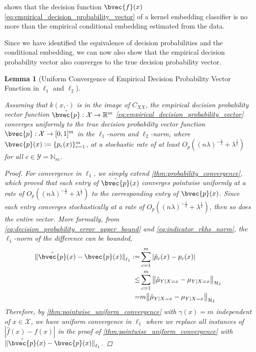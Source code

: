 \documentclass{article}
\newtheorem{lemma}[theorem]{Lemma}
\begin{document}
	 shows that the decision function $\bvec{f}(x)$ \eqref{eq:empirical_decision_probability_vector} of a kernel embedding classifier is no more than the empirical conditional embedding estimated from the data.

	Since we have identified the equivalence of decision probabilities and the conditional embedding, we can now also show that the empirical decision probability vector also converges to the true decision probability vector.

	\begin{lemma}[Uniform Convergence of Empirical Decision Probability Vector Function in $\ell_{1}$ and $\ell_{2}$]
	\label{thm:probability_vector_convergence} 
	
		Assuming that $k(x, \cdot)$ is in the image of $C_{XX}$, the empirical decision probability vector function $\hat{\bvec{p}} : \mathcal{X} \to \mathbb{R}^{m}$ \eqref{eq:empirical_decision_probability_vector} converges uniformly to the true decision probability vector function $\bvec{p} : \mathcal{X} \to [0, 1]^{m}$ in the $\ell_{1}$-norm and $\ell_{2}$-norm, where $\bvec{p}(x) := \{p_{c}(x)\}_{c = 1}^{m}$, at a stochastic rate of at least $O_{p}((n \lambda)^{-\frac{1}{2}} + \lambda^{\frac{1}{2}})$ for all $c \in \mathcal{Y} = \mathbb{N}_{m}$.
		
		\begin{proof}
			For convergence in $\ell_{1}$, we simply extend \cref{thm:probability_convergence}, which proved that each entry of $\hat{\bvec{p}}(x)$ converges pointwise uniformly at a rate of $O_{p}((n \lambda)^{-\frac{1}{2}} + \lambda^{\frac{1}{2}})$ to the corresponding entry of $\bvec{p}(x)$. Since each entry converges stochastically at a rate of $O_{p}((n \lambda)^{-\frac{1}{2}} + \lambda^{\frac{1}{2}})$, then so does the entire vector. More formally, from \eqref{eq:decision_probability_error_upper_bound} and \eqref{eq:indicator_rkhs_norm}, the $\ell_{1}$-norm of the difference can be bounded,
			\begin{equation}
				\begin{aligned}
					{\lVert \hat{\bvec{p}}(x) - \bvec{p}(x) \rVert}_{\ell_{1}} :=& \sum_{c = 1}^{m} | \hat{p}_{c}(x) - p_{c}(x) | \\
					\leq& \sum_{c = 1}^{m} \big\| \hat{\mu}_{Y | X = x} - \mu_{Y | X = x} \big\|_{\mathcal{H}_{\delta}} \\
					=& m \big\| \hat{\mu}_{Y | X = x} - \mu_{Y | X = x} \big\|_{\mathcal{H}_{\delta}}
				\end{aligned}
			\end{equation}
			Therefore, by \cref{thm:pointwise_uniform_convergence} with $\gamma(x) = m$ independent of $x \in \mathcal{X}$, we have uniform convergence in $\ell_{1}$ where we replace all instances of $| \hat{f}(x) - f(x) |$ in the proof of \cref{thm:pointwise_uniform_convergence} with ${\lVert \hat{\bvec{p}}(x) - \bvec{p}(x) \rVert}_{\ell_{1}}$.
			

\end{proof}
\end{lemma}
\end{document}
